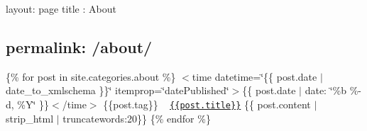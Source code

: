 

 layout\+: page title \+: About \subsection*{permalink\+: /about/ }



 \{\% for post in site.\+categories.\+about \%\}  $<$time datetime=\char`\"{}\{\{ post.\+date $\vert$ date\+\_\+to\+\_\+xmlschema \}\}\char`\"{} itemprop=\char`\"{}date\+Published\char`\"{}$>$\{\{ post.\+date $\vert$ date\+: \char`\"{}\%b \%-\/d, \%\+Y\char`\"{} \}\}$<$/time$>$   \{\{post.\+tag\}\}  ~\newline
  \href{{{site.url}}{{site.baseurl}}{{post.url}}}{\tt \{\{post.\+title\}\}}   \{\{ post.\+content $\vert$ strip\+\_\+html $\vert$ truncatewords\+:20\}\}   \{\% endfor \%\}  